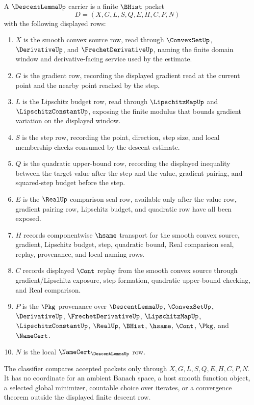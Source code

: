 \begin{definition}
\label{def:descent-lemma-carrier}
A $\DescentLemmaUp$ carrier is a finite $\BHist$ packet
$$
D=(X,G,L,S,Q,E,H,C,P,N)
$$
with the following displayed rows:
\begin{enumerate}
\item $X$ is the smooth convex source row, read through $\ConvexSetUp$, $\DerivativeUp$, and $\FrechetDerivativeUp$, naming the finite domain window and derivative-facing service used by the estimate.
\item $G$ is the gradient row, recording the displayed gradient read at the current point and the nearby point reached by the step.
\item $L$ is the Lipschitz budget row, read through $\LipschitzMapUp$ and $\LipschitzConstantUp$, exposing the finite modulus that bounds gradient variation on the displayed window.
\item $S$ is the step row, recording the point, direction, step size, and local membership checks consumed by the descent estimate.
\item $Q$ is the quadratic upper-bound row, recording the displayed inequality between the target value after the step and the value, gradient pairing, and squared-step budget before the step.
\item $E$ is the $\RealUp$ comparison seal row, available only after the value row, gradient pairing row, Lipschitz budget, and quadratic row have all been exposed.
\item $H$ records componentwise $\hsame$ transport for the smooth convex source, gradient, Lipschitz budget, step, quadratic bound, Real comparison seal, replay, provenance, and local naming rows.
\item $C$ records displayed $\Cont$ replay from the smooth convex source through gradient/Lipschitz exposure, step formation, quadratic upper-bound checking, and Real comparison.
\item $P$ is the $\Pkg$ provenance over $\DescentLemmaUp$, $\ConvexSetUp$, $\DerivativeUp$, $\FrechetDerivativeUp$, $\LipschitzMapUp$, $\LipschitzConstantUp$, $\RealUp$, $\BHist$, $\hsame$, $\Cont$, $\Pkg$, and $\NameCert$.
\item $N$ is the local $\NameCert_{\DescentLemmaUp}$ row.
\end{enumerate}
The classifier compares accepted packets only through $X,G,L,S,Q,E,H,C,P,N$. It has no coordinate for an ambient Banach space, a host smooth function object, a selected global minimizer, countable choice over iterates, or a convergence theorem outside the displayed finite descent row.
\end{definition}

